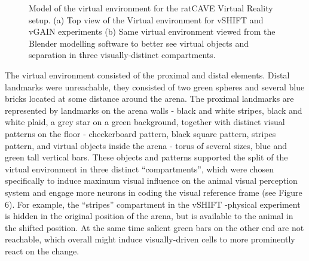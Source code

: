 \begin{figure}
\captionsetup{format=plain}
\caption[Design of the Virtual environment]{
Model of the virtual environment for the ratCAVE Virtual Reality setup. (a) Top view of the Virtual environment for vSHIFT and vGAIN experiments (b) Same virtual environment viewed from the Blender modelling software to better see virtual objects and separation in three visually-distinct compartments.
}
\label{fig:F6_virtual_scene}
\end{figure}

The virtual environment consisted of the proximal and distal elements. Distal landmarks were unreachable, they consisted of two green spheres and several blue bricks located at some distance around the arena. The proximal landmarks are represented by landmarks on the arena walls - black and white stripes, black and white plaid, a grey star on a green background, together with distinct visual patterns on the floor - checkerboard pattern, black square pattern, stripes pattern, and virtual objects inside the arena - torus of several sizes, blue and green tall vertical bars. These objects and patterns supported the split of the virtual environment in three distinct “compartments”, which were chosen specifically to induce maximum visual influence on the animal visual perception system and engage more neurons in coding the visual reference frame (see Figure 6). For example, the “stripes” compartment in the vSHIFT -physical experiment is hidden in the original position of the arena, but is available to the animal in the shifted position. At the same time salient green bars on the other end are not reachable, which overall might induce visually-driven cells to more prominently react on the change.


